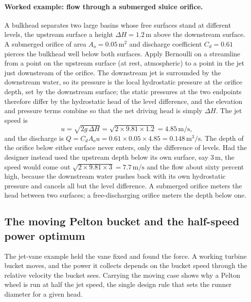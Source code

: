 \paragraph{Worked example: flow through a submerged sluice orifice.} A
bulkhead separates two large basins whose free surfaces stand at
different levels, the upstream surface a height $\Delta H =
1.2\,\si{\meter}$ above the downstream surface. A submerged orifice of
area $A_o = 0.05\,\si{\meter}^2$ and discharge coefficient $C_d = 0.61$
pierces the bulkhead well below both surfaces. Apply Bernoulli on a
streamline from a point on the upstream surface (at rest, atmospheric)
to a point in the jet just downstream of the orifice. The downstream
jet is surrounded by the downstream water, so its pressure is the local
hydrostatic pressure at the orifice depth, set by the downstream
surface; the static pressures at the two endpoints therefore differ by
the hydrostatic head of the level difference, and the elevation and
pressure terms combine so that the net driving head is simply $\Delta
H$. The jet speed is
\[
u = \sqrt{2 g\,\Delta H}
= \sqrt{2\times 9.81\times 1.2}
= 4.85\,\si{\meter\per\second},
\]
and the discharge is $Q = C_d A_o u = 0.61\times 0.05\times 4.85 =
0.148\,\si{\meter\cubed\per\second}$. The depth of the orifice below
either surface never enters, only the difference of levels. Had the
designer instead used the upstream depth below its own surface, say
$3\,\si{\meter}$, the speed would come out $\sqrt{2\times 9.81\times 3}
= 7.7\,\si{\meter\per\second}$ and the flow about sixty percent high,
because the downstream water pushes back with its own hydrostatic
pressure and cancels all but the level difference. A submerged orifice
meters the head between two surfaces; a free-discharging orifice meters
the depth below one.

\subsection{The moving Pelton bucket and the half-speed power optimum}

The jet-vane example held the vane fixed and found the force. A working
turbine bucket moves, and the power it collects depends on the bucket
speed through the relative velocity the bucket sees. Carrying the moving
case shows why a Pelton wheel is run at half the jet speed, the single
design rule that sets the runner diameter for a given head.

